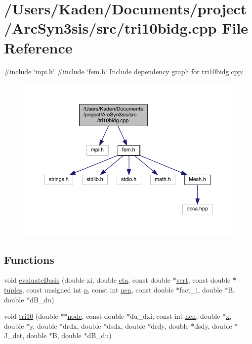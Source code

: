 \hypertarget{a00599}{}\section{/\+Users/\+Kaden/\+Documents/project/\+Arc\+Syn3sis/src/tri10bidg.cpp File Reference}
\label{a00599}
{\ttfamily \#include \char`\"{}mpi.\+h\char`\"{}}\newline
{\ttfamily \#include \char`\"{}fem.\+h\char`\"{}}\newline
Include dependency graph for tri10bidg.\+cpp\+:\nopagebreak
\begin{figure}[H]
\begin{center}
\leavevmode
\includegraphics[width=350pt]{a00600}
\end{center}
\end{figure}
\subsection*{Functions}
\begin{DoxyCompactItemize}
\item 
void \hyperlink{a00599_a2aba2292a481f3bb8f85213baf22686b}{evaluate\+Basis} (double xi, double \hyperlink{a00605_a28acc4a90fe6ffb907aa145b7b01326a}{eta}, const double $\ast$\hyperlink{a00605_a15bccd83c1e570e4a0ff17c42152989b}{vert}, const double $\ast$\hyperlink{a00605_ae906280b3cb956d2555d33b882cca5bf}{tuples}, const unsigned int \hyperlink{a00614_a1e0420801cd5156c14e085b87a4945f5}{p}, const int \hyperlink{a00605_acbbc42389c3587d1280ad7f1322035ba}{nen}, const double $\ast$fact\+\_\+i, double $\ast$B, double $\ast$d\+B\+\_\+du)
\item 
void \hyperlink{a00599_a5f6af94f39daf53ff33c328e81b7aeae}{tri10} (double $\ast$$\ast$\hyperlink{a00611_adf51fe9945b6ca147057cc27ff639d0f}{node}, const double $\ast$du\+\_\+dxi, const int \hyperlink{a00605_acbbc42389c3587d1280ad7f1322035ba}{nen}, double $\ast$\hyperlink{a00605_ac98c3bb25378222646e977292011625f}{x}, double $\ast$y, double $\ast$drdx, double $\ast$dsdx, double $\ast$drdy, double $\ast$dsdy, double $\ast$J\+\_\+det, double $\ast$B, double $\ast$d\+B\+\_\+du)
\end{DoxyCompactItemize}


